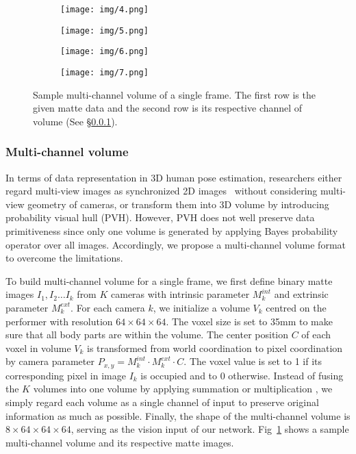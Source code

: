 \documentclass[10pt,twocolumn,letterpaper]{article}
\begin{document}
\begin{figure}
    \begin{subfigure}[b]{0.053\textwidth}
    \centering
        \texttt{[image: img/4.png]}
    \end{subfigure}
    \begin{subfigure}[b]{0.053\textwidth}
    \centering
        \texttt{[image: img/5.png]}
    \end{subfigure}
    \begin{subfigure}[b]{0.053\textwidth}
    \centering
        \texttt{[image: img/6.png]}
    \end{subfigure}
    \begin{subfigure}[b]{0.053\textwidth}
    \centering
        \texttt{[image: img/7.png]}
    \end{subfigure}
    \caption{Sample multi-channel volume of a single frame. The first row is the given matte data and the second row is its respective channel of volume (See \S\ref{sec:multi_c_v}). }
    \label{fig:volume}
    \vspace*{-14pt}
\end{figure}
\vspace{-0.3cm}
\subsubsection{Multi-channel volume}
\label{sec:multi_c_v}
In terms of data representation in 3D human pose estimation, researchers either regard multi-view images as synchronized 2D images~\cite{sun2018integral,nibali2018nu} without considering multi-view geometry of cameras, or transform them into 3D volume  \cite{trumble2017total,trumble2018deep} by introducing probability visual hull (PVH). However, PVH does not well preserve data primitiveness since only one volume is generated by applying Bayes probability operator over all images. Accordingly, we propose a multi-channel volume format to overcome the limitations. 

To build multi-channel volume for a single frame, we first define binary matte images $I_1,I_2 \dots I_k$ from $K$ cameras with intrinsic parameter $M_k^{int}$ and extrinsic parameter $M_k^{ext}$. For each camera $k$, we initialize a volume $V_k$ centred on the performer with resolution $64\times64\times64$. The voxel size is set to 35mm to make sure that all body parts are within the volume. The center position $C$ of each voxel in volume $V_k$ is transformed from world coordination to pixel coordination by camera parameter $P_{x,y} = M_k^{int}\cdot M_k^{ext}\cdot C$. The voxel value is set to 1 if its corresponding pixel in image $I_k$ is occupied and to 0 otherwise. Instead of fusing the $K$ volumes into one volume by applying summation or multiplication \cite{trumble2017total,trumble2018deep} , we simply regard each volume as a single channel of input to preserve original information as much as possible. Finally, the shape of the multi-channel volume is $8\times64\times64\times64$, serving as the vision input of our network. Fig~\ref{fig:volume} shows a sample multi-channel volume and its respective matte images. 
\vspace{-0.3cm}
\end{document}
